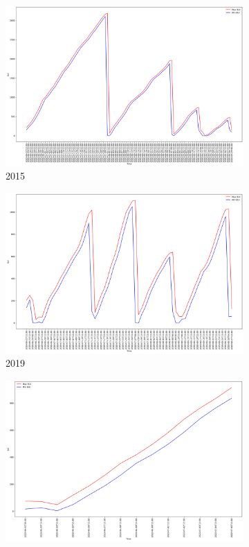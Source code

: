 \begin{figure}[h]
	\centering
	\caption{Daily max and min BUI values}
	\begin{subfigure}{0.45\textwidth}
		\centering
		\includegraphics[width=\textwidth]{graphs/2015/byHour/BUI_maxMin.png}
		\caption{2015}
	\end{subfigure}
	\hfill
	\begin{subfigure}{0.45\textwidth}
		\centering
		\includegraphics[width=\textwidth]{graphs/2019/byHour/BUI_maxMin.png}
		\caption{2019}
	\end{subfigure}
	\hfill
	\begin{subfigure}{0.45\textwidth}
		\centering
		\includegraphics[width=\textwidth]{graphs/2022/BUI_maxMin.png}

\end{subfigure}
\end{figure}
